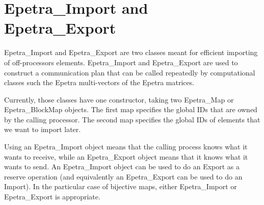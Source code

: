 
\section{Epetra\_Import and Epetra\_Export}
\label{sec:import_export}

Epetra\_Import and Epetra\_Export are two classes meant for efficient
importing of off-processors elements. Epetra\_Import and Epetra\_Export
are used to construct a communication plan that can be called repeatedly
by computational classes such the Epetra multi-vectors of the Epetra
matrices.

Currently, those classes have one constructor, taking two Epetra\_Map or
Epetra\_BlockMap objects. The first map specifies the global IDs that
are owned by the calling processor. The second map specifies the global
IDs of  elements that we want to import later.

Using an Epetra\_Import object means that the calling process knows what
it wants to receive, while an Epetra\_Export object means that it knows
what it wants to send. An Epetra\_Import object can be used to do an
Export as a reserve operation (and equivalently an Epetra\_Export can be
used to do an Import). In the particular case of bijective maps, either
Epetra\_Import or Epetra\_Export is appropriate.

\medskip

